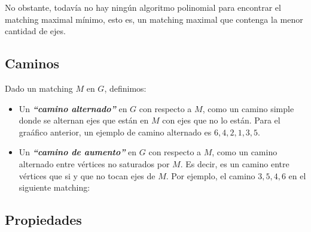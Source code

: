 No obstante, todav\'ia no hay ning\'un algoritmo polinomial para encontrar el matching maximal m\'inimo, esto es, un matching maximal que contenga la menor cantidad de ejes.

\newpage
\subsection{Caminos}

Dado un matching $M$ en $G$, definimos:

\begin{itemize}
\item Un \textbf{\emph{``camino alternado''}} en $G$ con respecto a $M$, como un camino simple donde se alternan ejes que est\'an en $M$ con ejes que no lo est\'an. Para el gra\'afico anterior, un ejemplo de camino alternado es $6,4,2,1,3,5$.
\item Un \textbf{\emph{``camino de aumento''}} en $G$ con respecto a $M$, como un camino alternado entre v\'ertices no saturados por $M$. Es decir, es un camino entre v\'ertices que si y que no tocan ejes de $M$. Por ejemplo, el camino $3,5,4,6$ en el siguiente matching:

\raggedright
\bigskip
\begin{center}
\end{center}
\raggedright
\bigskip

\end{itemize}

\subsection{Propiedades}

